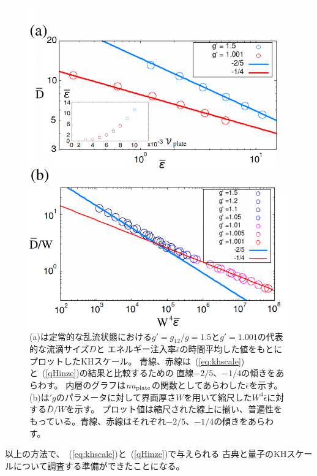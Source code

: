 \documentclass[12pt,a4paper]{jbook}
\begin{document}
		\begin{figure}[H]
			\begin{center}
			\includegraphics[width=13cm]{fig23.eps}
			\caption{
                (a)は定常的な乱流状態における$g' = g_{12}/g=1.5$と$g'=1.001$の代表的な流滴サイズ$D$と
                エネルギー注入率$\bar\epsilon$の時間平均した値をもとにプロットしたKHスケール。
                青線、赤線は~(\ref{eq:khscale})と~(\ref{qHinze})の結果と比較するための
                直線$-2/5$、$-1/4$の傾きをあらわす。
                内層のグラフは$nu_{\rm plate}$の関数としてあらわした$\bar\epsilon$を示す。
                (b)は$'g$のパラメータに対して界面厚さ$W$を用いて縮尺した$W^4 \bar\epsilon$に対する$\bar D / W$を示す。
                プロット値は縮尺された線上に揃い、普遍性をもっている。青線、赤線はそれぞれ$-2/5$、$-1/4$の傾きをあらわす。
			}
			\label{FIG:hinze}
			\end{center}
		\end{figure}
        以上の方法で、~(\ref{eq:khscale})と~(\ref{qHinze})で与えられる
        古典と量子のKHスケールについて調査する準備ができたことになる。
\end{document}

